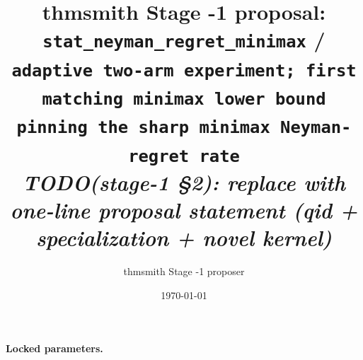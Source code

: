 \documentclass[11pt]{article}
\title{thmsmith Stage -1 proposal: \texttt{stat\_neyman\_regret\_minimax} / \texttt{adaptive two-arm experiment; first matching minimax lower bound pinning the sharp minimax Neyman-regret rate}%
  \\ \large\textit{TODO(stage-1 \S2): replace with one-line proposal statement (qid + specialization + novel kernel)}}
\author{thmsmith Stage -1 proposer}
\date{\today}
\theoremstyle{definition}
\theoremstyle{plain}
\theoremstyle{remark}
\begin{document}
\maketitle


\paragraph{Locked parameters.}

\begin{abstract}
\end{abstract}
\end{document}
